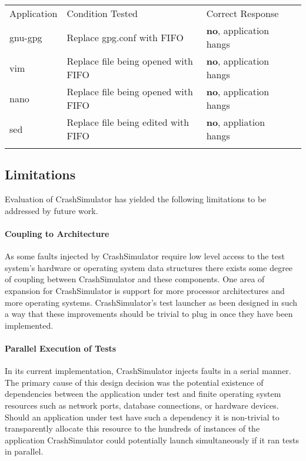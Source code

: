             \begin{table}[H]
                \scriptsize{}
                \begin{tabular}{l  l  l  l}
                \toprule{}
                  Application & Condition Tested & Correct Response\\
                  gnu-gpg & Replace gpg.conf with FIFO & \textbf{no}, application hangs\\
                  vim & Replace file being opened with FIFO & \textbf{no}, application hangs\\
                  nano & Replace file being opened with FIFO & \textbf{no}, application hangs\\
                  sed & Replace file being edited with FIFO & \textbf{no}, appliation hangs\\
                \bottomrule{}
                \end{tabular}
            \end{table}
        
        
        

    \subsection{Limitations}

        Evaluation of CrashSimulator has yielded the following limitations to be addressed by future work.

        \paragraph{Coupling to Architecture}

            As some faults injected by CrashSimulator require low level access to the test system's hardware or
            operating system data structures there exists some degree of coupling between CrashSimulator and these
            components. One area of expansion for CrashSimulator is support for more processor architectures and more
            operating systems.  CrashSimulator's test launcher as been designed in such a way that these improvements
            should be trivial to plug in once they have been implemented.

        \paragraph{Parallel Execution of Tests}

            In its current implementation, CrashSimulator injects faults in a serial manner. The primary cause of this
            design decision was the potential existence of dependencies between the application under test and finite
            operating system resources such as network ports, database connections, or hardware devices. Should an
            application under test have such a dependency it is non-trivial to transparently allocate this resource to
            the hundreds of instances of the application CrashSimulator could potentially launch simultaneously if it
            ran tests in parallel.

